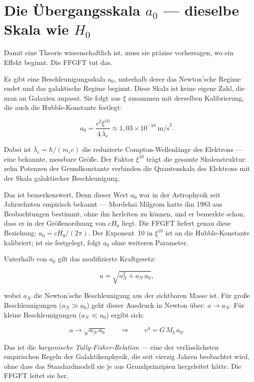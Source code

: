 \documentclass[11pt,oneside]{book}
\begin{document}
\chapter{Die Übergangsskala $a_0$ — dieselbe Skala wie $H_0$}

Damit eine Theorie wissenschaftlich ist, muss sie präzise
vorhersagen, wo ein Effekt beginnt. Die FFGFT tut das.

Es gibt eine Beschleunigungsskala $a_0$, unterhalb derer das
Newton'sche Regime endet und das galaktische Regime beginnt.
Diese Skala ist keine eigene Zahl, die man an Galaxien anpasst.
Sie folgt aus $\xi$ zusammen mit derselben Kalibrierung, die auch
die Hubble-Konstante festlegt:

\[
  a_0 = \frac{c^2 \xi^{10}}{4\,\bar{\lambda}_e}
    \approx 1{,}03 \times 10^{-10}~\text{m/s}^2 .
\]

Dabei ist $\bar{\lambda}_e = \hbar/(m_e c)$ die reduzierte
Compton-Wellenlänge des Elektrons — eine bekannte, messbare
Größe. Der Faktor $\xi^{10}$ trägt die gesamte
Skalenstruktur: zehn Potenzen der Grundkonstante verbinden
die Quantenskala des Elektrons mit der Skala galaktischer
Beschleunigung.

Das ist bemerkenswert. Denn dieser Wert $a_0$ war in der
Astrophysik seit Jahrzehnten empirisch bekannt — Mordehai
Milgrom hatte ihn 1983 aus Beobachtungen bestimmt, ohne ihn
herleiten zu können, und er bemerkte schon, dass er in der
Größenordnung von $cH_0$ liegt. Die FFGFT liefert genau diese
Beziehung: $a_0 = cH_0/(2\pi)$. Der Exponent~10 in $\xi^{10}$ ist
an die Hubble-Konstante kalibriert; ist sie festgelegt, folgt
$a_0$ ohne weiteren Parameter.

Unterhalb von $a_0$ gilt das modifizierte Kraftgesetz:

\[
  a = \sqrt{a_N^2 + a_N\,a_0} ,
\]

wobei $a_N$ die Newton'sche Beschleunigung aus der sichtbaren
Masse ist. Für große Beschleunigungen ($a_N \gg a_0$) geht
dieser Ausdruck in Newton über: $a \to a_N$. Für kleine
Beschleunigungen ($a_N \ll a_0$) ergibt sich:

\[
  a \to \sqrt{a_N\,a_0} \qquad\Longrightarrow\qquad
  v^4 = G\,M_b\,a_0 .
\]

Das ist die \emph{baryonische Tully-Fisher-Relation} — eine
der verlässlichsten empirischen Regeln der Galaktikenphysik,
die seit vierzig Jahren beobachtet wird, ohne dass das
Standardmodell sie je aus Grundprinzipien hergeleitet hätte.
Die FFGFT leitet sie her.
\end{document}
